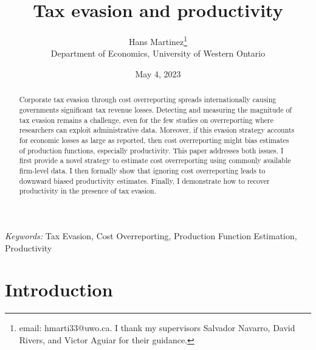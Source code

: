 \documentclass[
  12pt]{article}
\theoremstyle{definition}
\theoremstyle{remark}
\begin{document}
\def\spacingset#1{\renewcommand{\baselinestretch}%
{#1}\small\normalsize} \spacingset{1}



\date{May 4, 2023}
\title{\bf Tax evasion and productivity}
\author{
Hans Martinez\thanks{email: hmarti33@uwo.ca. I thank my supervisors
Salvador Navarro, David Rivers, and Victor Aguiar for their guidance.}\\
Department of Economics, University of Western Ontario\\
}
\maketitle

\bigskip
\bigskip
\begin{abstract}
Corporate tax evasion through cost overreporting spreads internationally
causing governments significant tax revenue losses. Detecting and
measuring the magnitude of tax evasion remains a challenge, even for the
few studies on overreporting where researchers can exploit
administrative data. Moreover, if this evasion strategy accounts for
economic losses as large as reported, then cost overreporting might bias
estimates of production functions, especially productivity. This paper
addresses both issues. I first provide a novel strategy to estimate cost
overreporting using commonly available firm-level data. I then formally
show that ignoring cost overreporting leads to downward biased
productivity estimates. Finally, I demonstrate how to recover
productivity in the presence of tax evasion.
\end{abstract}

\noindent%
{\it Keywords:} Tax Evasion, Cost Overreporting, Production Function
Estimation, Productivity
\vfill

\newpage
\spacingset{1.9} %
\ifdefined\Shaded\renewenvironment{Shaded}{\begin{tcolorbox}[breakable, interior hidden, frame hidden, boxrule=0pt, borderline west={3pt}{0pt}{shadecolor}, enhanced, sharp corners]}{\end{tcolorbox}}\fi

\hypertarget{introduction}{%
\section*{Introduction}\label{introduction}}
\end{document}
